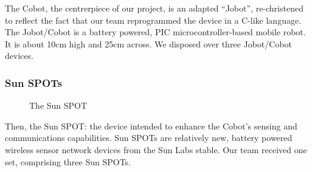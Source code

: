 \documentclass[a4paper,10pt]{article} %
\begin{document}
The Cobot, the centrerpiece of our project, is an adapted ``Jobot'',
re-christened to reflect the fact that our team reprogrammed the device in a
C-like language. The Jobot/Cobot is a battery powered, PIC microcontroller-based
mobile robot. It is about 10cm high and 25cm across. We disposed over three
Jobot/Cobot devices.

\subsubsection{Sun SPOTs}

\begin{figure}[H]
    \centering
    \caption{The Sun SPOT}
    \label{fig:sunspotviews}
\end{figure}

Then, the Sun SPOT: the device intended to enhance the Cobot's sensing and
communications capabilities. Sun SPOTs are relatively new, battery powered
wireless sensor network devices from the Sun Labs stable. Our team received one
set, comprising three Sun SPOTs.
\end{document}
